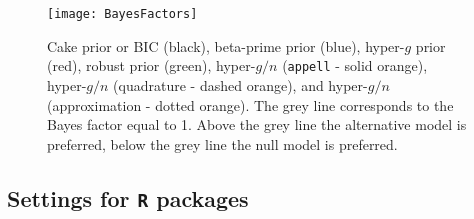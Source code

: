\documentclass[12pt]{article}
\begin{document}
\begin{figure}[h!]
	\centering
	\texttt{[image: BayesFactors]}
	\caption{Cake prior or BIC (black), 
		beta-prime prior (blue), 
		hyper-$g$ prior (red),
		robust prior (green),
		hyper-$g/n$ ({\tt appell} - solid orange),
		hyper-$g/n$ (quadrature - dashed orange), 
		and hyper-$g/n$ (approximation - dotted orange). The grey line corresponds to the Bayes factor equal to 1. Above the grey line the alternative model is preferred, below the grey line the null model is preferred.}
	\label{fig:bayesfactors}
\end{figure}

\subsection{Settings for {\tt R} packages} 
\end{document}
